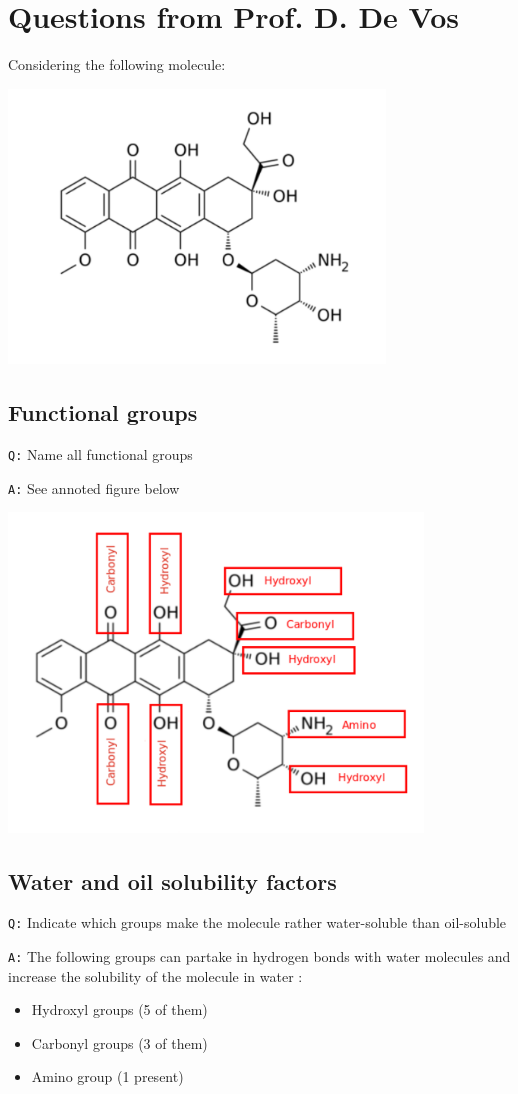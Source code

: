 \documentclass[11pt, a4paper,titlepage]{article}
\begin{document}
\section{Questions from Prof. D. De Vos}
\label{sec-3}

Considering the following molecule:

\includegraphics[width=10cm]{./Figures/Part3MoleculeRaw.pdf}
\subsection{Functional groups}
\label{sec-3-1}

\texttt{Q:} Name all functional groups

\texttt{A:} See annoted figure below

\includegraphics[width=11cm]{./Figures/Part3MoleculeFunctionalGroups.pdf}
\subsection{Water and oil solubility factors}
\label{sec-3-2}

\texttt{Q:} Indicate which groups make the molecule rather water-soluble
than oil-soluble

\texttt{A:} The following groups can partake in hydrogen bonds with water
molecules and increase the solubility of the molecule in water :

\begin{itemize}
\item Hydroxyl groups (5 of them)
\item Carbonyl groups (3 of them)
\item Amino group (1 present)
\end{itemize}
\end{document}
